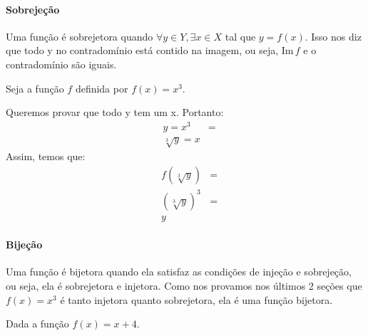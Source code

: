 \paragraph{Sobrejeção} Uma função é sobrejetora quando $\forall y \in Y, \exists x \in X$ tal que $ y=f(x)$. Isso nos diz que todo y no contradomínio está contido na imagem, ou seja, $\textrm{Im} \, f$ e o contradomínio são iguais.\\
\begin{exemplo} Seja a função $f$ definida por $f(x)= x^3$. \par 
Queremos provar que todo y tem um x. Portanto:\\
\begin{align*}
&y=x^3 &=\\
&\sqrt[3]{y}=x
\end{align*}
Assim, temos que:
\begin{align*}
&f(\sqrt[3]{y}) &=\\
&(\sqrt[3]{y})^3 &= \\
&y
\end{align*}
\end{exemplo}

\paragraph{Bijeção} Uma função é bijetora quando ela satisfaz as condições de injeção e sobrejeção, ou seja, ela é sobrejetora e injetora. Como nos provamos nos últimos 2 seções que $f(x)=x^3$ é tanto injetora quanto sobrejetora, ela é uma função bijetora.\\
\begin{exemplo} Dada a função $f(x)= x+4$. 

\end{exemplo}

